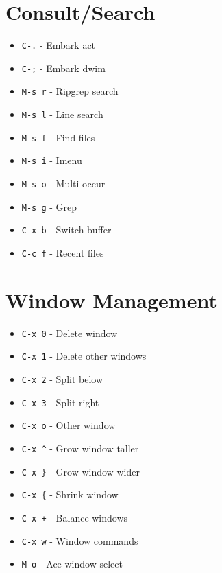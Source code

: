 \documentclass[6pt,landscape]{article}
\newcommand{\key}[1]{\texttt{#1}}
\begin{document}
\begin{multicols*}{5}
\section*{Consult/Search}
\begin{itemize}[leftmargin=*,itemsep=0pt,parsep=0pt,topsep=0pt]
\item \key{C-.} - Embark act
\item \key{C-;} - Embark dwim
\item \key{M-s r} - Ripgrep search
\item \key{M-s l} - Line search
\item \key{M-s f} - Find files
\item \key{M-s i} - Imenu
\item \key{M-s o} - Multi-occur
\item \key{M-s g} - Grep
\item \key{C-x b} - Switch buffer
\item \key{C-c f} - Recent files
\end{itemize}

\section*{Window Management}
\begin{itemize}[leftmargin=*,itemsep=0pt,parsep=0pt,topsep=0pt]
\item \key{C-x 0} - Delete window
\item \key{C-x 1} - Delete other windows
\item \key{C-x 2} - Split below
\item \key{C-x 3} - Split right
\item \key{C-x o} - Other window
\item \key{C-x \textasciicircum} - Grow window taller
\item \key{C-x \}} - Grow window wider
\item \key{C-x \{} - Shrink window
\item \key{C-x +} - Balance windows
\item \key{C-x w} - Window commands
\item \key{M-o} - Ace window select
\end{itemize}

\columnbreak

\end{multicols*}
\end{document}
